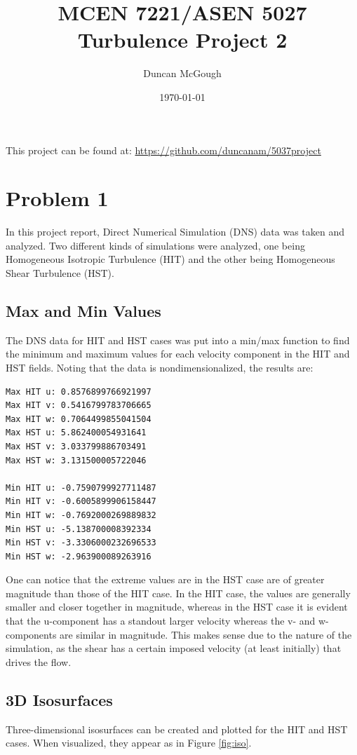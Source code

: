 \documentclass[12pt]{article}
\title{MCEN 7221/ASEN 5027 Turbulence Project 2}
\author{Duncan McGough}
\date{\today}
\begin{document}
\maketitle

This project can be found at: \url{https://github.com/duncanam/5037project}
\tableofcontents
\listoffigures
\newpage

\section{Problem 1}
In this project report, Direct Numerical Simulation (DNS) data was taken and analyzed. Two different kinds of simulations were analyzed, one being Homogeneous Isotropic Turbulence (HIT) and the other being Homogeneous Shear Turbulence (HST). 

\subsection{Max and Min Values}
The DNS data for HIT and HST cases was put into a min/max function to find the minimum and maximum values for each velocity component in the HIT and HST fields. Noting that the data is nondimensionalized, the results are:
\begin{lstlisting}
Max HIT u: 0.8576899766921997
Max HIT v: 0.5416799783706665
Max HIT w: 0.7064499855041504
Max HST u: 5.862400054931641
Max HST v: 3.033799886703491
Max HST w: 3.131500005722046

Min HIT u: -0.7590799927711487
Min HIT v: -0.6005899906158447
Min HIT w: -0.7692000269889832
Min HST u: -5.138700008392334
Min HST v: -3.3306000232696533
Min HST w: -2.963900089263916
\end{lstlisting}

One can notice that the extreme values are in the HST case are of greater magnitude than those of the HIT case. In the HIT case, the values are generally smaller and closer together in magnitude, whereas in the HST case it is evident that the u-component has a standout larger velocity whereas the v- and w-components are similar in magnitude. This makes sense due to the nature of the simulation, as the shear has a certain imposed velocity (at least initially) that drives the flow. 

\subsection{3D Isosurfaces}
Three-dimensional isosurfaces can be created and plotted for the HIT and HST cases. When visualized, they appear as in Figure \ref{fig:iso}.
\end{document}
